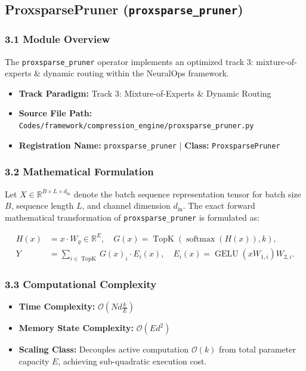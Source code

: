 \subsection{ProxsparsePruner (\texttt{proxsparse\_pruner})}
\label{sec:app_module_proxsparse\_pruner}

\subsubsection*{3.1 Module Overview}
The \texttt{proxsparse\_pruner} operator implements an optimized track 3: mixture-of-experts \& dynamic routing within the NeuralOps framework.
\begin{itemize}
    \item \textbf{Track Paradigm:} Track 3: Mixture-of-Experts & Dynamic Routing
    \item \textbf{Source File Path:} \texttt{Codes/framework/compression\_engine/proxsparse\_pruner.py}
    \item \textbf{Registration Name:} \texttt{proxsparse\_pruner} $\mid$ \textbf{Class:} \texttt{ProxsparsePruner}
\end{itemize}

\subsubsection*{3.2 Mathematical Formulation}
Let $X \in \mathbb{R}^{B \times L \times d_{\text{in}}}$ denote the batch sequence representation tensor for batch size $B$, sequence length $L$, and channel dimension $d_{\text{in}}$. The exact forward mathematical transformation of \texttt{proxsparse\_pruner} is formulated as:

\begin{align}
H(x) &= x \cdot W_g \in \mathbb{R}^{E}, \quad G(x) = \operatorname{TopK}\left(\operatorname{softmax}(H(x)), k\right), \\
Y &= \sum_{i \in \operatorname{TopK}} G(x)_i \cdot E_i(x), \quad E_i(x) = \operatorname{GELU}(x W_{1, i}) W_{2, i}.
\end{align}


\subsubsection*{3.3 Computational Complexity}
\begin{itemize}
    \item \textbf{Time Complexity:} $\mathcal{O}(N d \frac{k}{E})$
    \item \textbf{Memory State Complexity:} $\mathcal{O}(E d^2)$
    \item \textbf{Scaling Class:} Decouples active computation $\mathcal{O}(k)$ from total parameter capacity $E$, achieving sub-quadratic execution cost.
\end{itemize}


